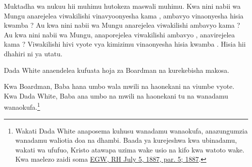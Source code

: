 Muktadha wa nukuu hii muhimu hutokeza maswali muhimu. Kwa nini nabii wa Mungu anarejelea viwakilishi vinavyoonyesha  kama , ambavyo vinaonyesha hisia kwamba ? Au kwa nini nabii wa Mungu anarejelea viwakilishi ambavyo  kama ? Au kwa nini nabii wa Mungu, anaporejelea viwakilishi ambavyo , anavirejelea kama ? Viwakilishi hivi vyote vya kimizimu vinaonyesha hisia kwamba . Hisia hii dhahiri ni ya utatu.

Dada White anaendelea kufuata hoja za Boardman na kurekebisha makosa.

\begin{table}[H]
\centering
\renewcommand{\arraystretch}{1.5}
\setlength{\tabcolsep}{15pt}
\end{table}

Kwa Boardman, Baba hana umbo wala mwili na haonekani na viumbe vyote. Kwa Dada White, Baba ana umbo na mwili na haonekani tu na wanadamu wanaokufa.\footnote{Wakati Dada White anaposema kuhusu wanadamu wanaokufa, anazungumzia wanadamu waliotia doa na dhambi. Baada ya kurejeshwa kwa ubinadamu, wakati wa ufufuo, Kristo atawapa uzima wake usio na kifo kwa watoto wake. Kwa maelezo zaidi soma \href{https://egwwritings.org/?ref=en_RH.July.5.1887.par.5}{EGW, RH July 5, 1887, par. 5; 1887}.}

